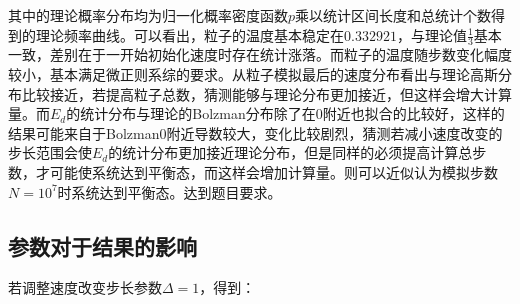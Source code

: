 \documentclass[a4paper,11pt]{article}
\begin{document}
其中的理论概率分布均为归一化概率密度函数$p$乘以统计区间长度和总统计个数得到的理论频率曲线。可以看出，粒子的温度基本稳定在$0.332921$，与理论值$\frac{1}{3}$基本一致，差别在于一开始初始化速度时存在统计涨落。而粒子的温度随步数变化幅度较小，基本满足微正则系综的要求。从粒子模拟最后的速度分布看出与理论高斯分布比较接近，若提高粒子总数，猜测能够与理论分布更加接近，但这样会增大计算量。而$E_{d}$的统计分布与理论的Bolzman分布除了在$0$附近也拟合的比较好，这样的结果可能来自于Bolzman$0$附近导数较大，变化比较剧烈，猜测若减小速度改变的步长范围会使$E_{d}$的统计分布更加接近理论分布，但是同样的必须提高计算总步数，才可能使系统达到平衡态，而这样会增加计算量。则可以近似认为模拟步数$N=10^{7}$时系统达到平衡态。达到题目要求。


\subsection{参数对于结果的影响}
若调整速度改变步长参数$\Delta = 1$，得到：
\end{document}

